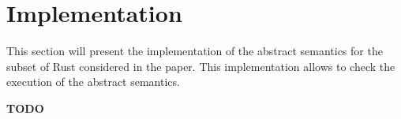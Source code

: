 \section{Implementation}\label{sec:implementation}

This section will present the implementation of the abstract semantics
for the subset of Rust considered in the paper. This implementation allows
to check the execution of the abstract semantics.

\textbf{TODO}
